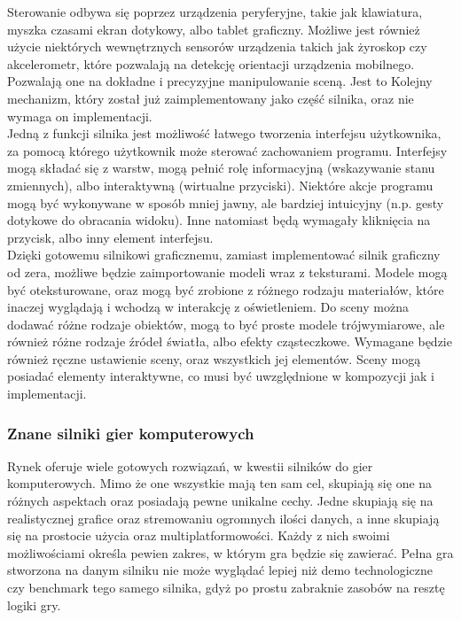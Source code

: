 \documentclass{article} %
\begin{document}
        Sterowanie odbywa się poprzez urządzenia peryferyjne, takie jak klawiatura, myszka czasami ekran dotykowy, albo tablet graficzny. Możliwe jest również użycie niektórych wewnętrznych sensorów urządzenia takich jak żyroskop czy akcelerometr, które pozwalają na detekcję orientacji urządzenia mobilnego. Pozwalają one na dokładne i precyzyjne manipulowanie sceną. Jest to Kolejny mechanizm, który został już zaimplementowany jako część silnika, oraz nie wymaga on implementacji.
        \\
        
        Jedną z funkcji silnika jest możliwość łatwego tworzenia interfejsu użytkownika, za pomocą którego użytkownik może sterować zachowaniem programu. Interfejsy mogą składać się z warstw, mogą pełnić rolę informacyjną (wskazywanie stanu zmiennych), albo interaktywną (wirtualne przyciski). Niektóre akcje programu mogą być wykonywane w sposób mniej jawny, ale bardziej intuicyjny (n.p. gesty dotykowe do obracania widoku). Inne natomiast będą wymagały kliknięcia na przycisk, albo inny element interfejsu.
        \\
        
        Dzięki gotowemu silnikowi graficznemu, zamiast implementować silnik graficzny od zera, możliwe będzie zaimportowanie modeli wraz z teksturami. Modele mogą być oteksturowane, oraz mogą być zrobione z różnego rodzaju materiałów, które inaczej wyglądają i wchodzą w interakcję z oświetleniem. Do sceny można dodawać różne rodzaje obiektów, mogą to być proste modele trójwymiarowe, ale również różne rodzaje źródeł światła, albo efekty cząsteczkowe. Wymagane będzie również ręczne ustawienie sceny, oraz wszystkich jej elementów. Sceny mogą posiadać elementy interaktywne, co musi być uwzględnione w kompozycji jak i implementacji.
        \\
                      
        \subsubsection{Znane silniki gier komputerowych}
        Rynek oferuje wiele gotowych rozwiązań, w kwestii silników do gier komputerowych. Mimo że one wszystkie mają ten sam cel, skupiają się one na różnych aspektach oraz posiadają pewne unikalne cechy. Jedne skupiają się na realistycznej grafice oraz stremowaniu ogromnych ilości danych, a inne skupiają się na prostocie użycia oraz multiplatformowości. Każdy z nich swoimi możliwościami określa pewien zakres, w którym gra będzie się zawierać. Pełna gra stworzona na danym silniku nie może wyglądać lepiej niż demo technologiczne czy benchmark tego samego silnika, gdyż po prostu zabraknie zasobów na resztę logiki gry.
        \\
        
\end{document}
